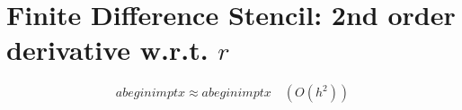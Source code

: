 \documentclass{article}
\begin{document}
\section*{Finite Difference Stencil: 2nd order derivative w.r.t. $r$}


\[
a begin i m p t x \approx a begin i m p t x \quad (O(h^2))
\]
\end{document}
